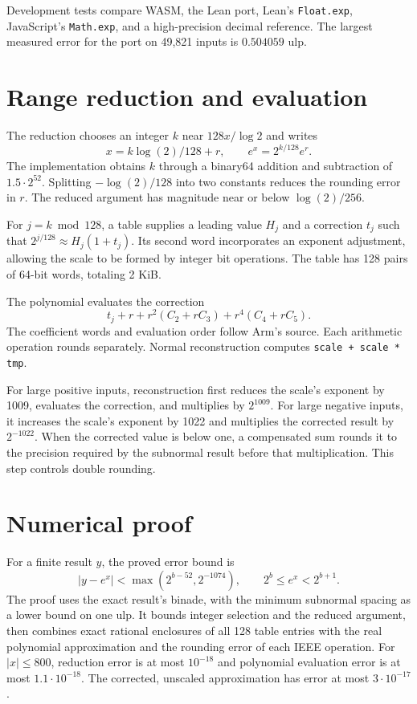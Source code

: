 Development tests compare WASM, the Lean port,
Lean's \texttt{Float.exp}, JavaScript's \texttt{Math.exp}, and a high-precision
decimal reference.  The largest measured error for the port on 49,821 inputs
is $0.504059$ ulp.

\section{Range reduction and evaluation}
The reduction chooses an integer $k$ near $128x/\log 2$ and writes
\[
  x=k\log(2)/128+r,\qquad e^x=2^{k/128}e^r.
\]
The implementation obtains $k$ through a binary64 addition and subtraction
of $1.5\cdot2^{52}$.  Splitting $-\log(2)/128$ into two constants reduces
the rounding error in $r$.  The reduced argument has magnitude near or
below $\log(2)/256$.

For $j=k\bmod128$, a table supplies a leading value $H_j$ and a correction
$t_j$ such that $2^{j/128}\approx H_j(1+t_j)$.  Its second word incorporates
an exponent adjustment, allowing the scale to be formed by integer bit
operations.  The table has 128 pairs of 64-bit words, totaling 2 KiB.

The polynomial evaluates the correction
\[
 t_j+r+r^2(C_2+rC_3)+r^4(C_4+rC_5).
\]
The coefficient words and evaluation order follow Arm's source.  Each
arithmetic operation rounds separately.  Normal reconstruction computes
\texttt{scale + scale * tmp}.

For large positive inputs, reconstruction first reduces the scale's exponent
by 1009, evaluates the correction, and multiplies by $2^{1009}$.  For large
negative inputs, it increases the scale's exponent by 1022 and multiplies
the corrected result by $2^{-1022}$.  When the corrected value is below one,
a compensated sum rounds it to the precision required by the subnormal
result before that multiplication.  This step controls double rounding.

\section{Numerical proof}
For a finite result $y$, the proved error bound is
\[
 |y-e^x|<\max(2^{b-52},2^{-1074}),\qquad 2^b\le e^x<2^{b+1}.
\]
The proof uses the exact result's binade, with the minimum subnormal spacing
as a lower bound on one ulp.  It bounds integer selection and the reduced
argument, then combines exact rational enclosures of all 128 table entries
with the real polynomial approximation and the rounding error of each IEEE
operation.  For $|x|\le800$, reduction error is at most $10^{-18}$ and
polynomial evaluation error is at most $1.1\cdot10^{-18}$.  The corrected,
unscaled approximation has error at most $3\cdot10^{-17}$.

